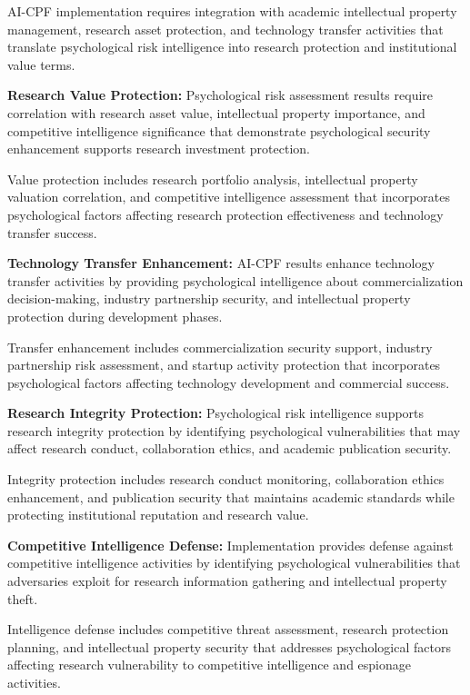 \documentclass[10pt, twocolumn]{article}
\begin{document}
AI-CPF implementation requires integration with academic intellectual property management, research asset protection, and technology transfer activities that translate psychological risk intelligence into research protection and institutional value terms.

\textbf{Research Value Protection:} Psychological risk assessment results require correlation with research asset value, intellectual property importance, and competitive intelligence significance that demonstrate psychological security enhancement supports research investment protection.

Value protection includes research portfolio analysis, intellectual property valuation correlation, and competitive intelligence assessment that incorporates psychological factors affecting research protection effectiveness and technology transfer success.

\textbf{Technology Transfer Enhancement:} AI-CPF results enhance technology transfer activities by providing psychological intelligence about commercialization decision-making, industry partnership security, and intellectual property protection during development phases.

Transfer enhancement includes commercialization security support, industry partnership risk assessment, and startup activity protection that incorporates psychological factors affecting technology development and commercial success.

\textbf{Research Integrity Protection:} Psychological risk intelligence supports research integrity protection by identifying psychological vulnerabilities that may affect research conduct, collaboration ethics, and academic publication security.

Integrity protection includes research conduct monitoring, collaboration ethics enhancement, and publication security that maintains academic standards while protecting institutional reputation and research value.

\textbf{Competitive Intelligence Defense:} Implementation provides defense against competitive intelligence activities by identifying psychological vulnerabilities that adversaries exploit for research information gathering and intellectual property theft.

Intelligence defense includes competitive threat assessment, research protection planning, and intellectual property security that addresses psychological factors affecting research vulnerability to competitive intelligence and espionage activities.
\end{document}
